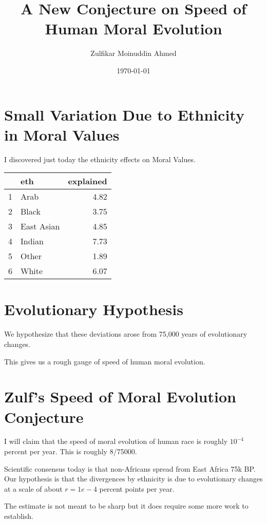 \documentclass{amsart}
\title{A New Conjecture on Speed of Human Moral Evolution}
\author{Zulfikar Moinuddin Ahmed}
\date{\today}
\begin{document}
\maketitle

\section{Small Variation Due to Ethnicity in Moral Values}

I discovered just today the ethnicity effects on Moral Values.

\begin{table}[ht]
\centering
\begin{tabular}{rlr}
  \hline
 & eth & explained \\ 
  \hline
1 & Arab & 4.82 \\ 
  2 & Black & 3.75 \\ 
  3 & East Asian & 4.85 \\ 
  4 & Indian & 7.73 \\ 
  5 & Other & 1.89 \\ 
  6 & White & 6.07 \\ 
   \hline
\end{tabular}
\end{table}

\section{Evolutionary Hypothesis}

We hypothesize that these deviations arose from 75,000 years of evolutionary changes.

This gives us a rough gauge of speed of human moral evolution.  

\section{Zulf's Speed of Moral Evolution Conjecture}

I will claim that the speed of moral evolution of human race is roughly $10^{-4}$ percent per year.  This is roughly 8/75000.

Scientific consensus today is that non-Africans spread from East Africa 75k BP.  Our hypothesis is that the divergences by ethnicity is due to evolutionary changes at a scale of about $r=1e-4$ percent points per year.

The estimate is not meant to be sharp but it does require some more work to 
establish.
\end{document}
